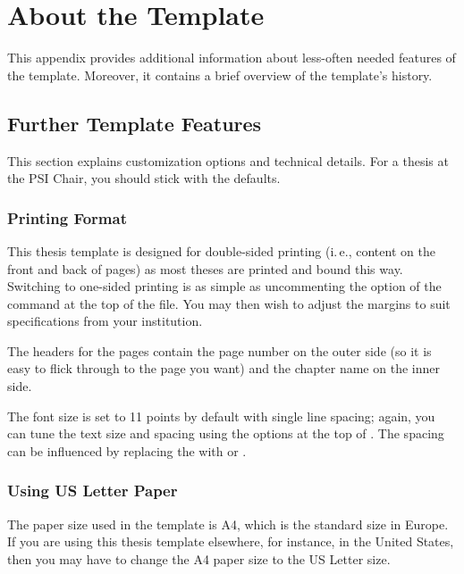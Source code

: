 
\chapter{About the Template}
\label{appendixc}
\label{appendix-more-details-on-template}

This appendix provides additional information about less-often needed features of the template. Moreover, it contains a brief overview of the template's history. 

\section{Further Template Features}\label{ThesisFeatures}

This section explains customization options and technical details. For a thesis at the PSI Chair, you should stick with the defaults.

\subsection{Printing Format}

This thesis template is designed for double-sided printing (i.\,e., content on the front and back of pages) as most theses are printed and bound this way.
Switching to one-sided printing is as simple as uncommenting the  option of the  command at the top of the  file. You may then wish to adjust the margins to suit specifications from your institution.

The headers for the pages contain the page number on the outer side (so it is easy to flick through to the page you want) and the chapter name on the inner side.

The font size is set to 11 points by default with single line spacing; again, you can tune the text size and spacing using the options at the top of . The spacing can be influenced by replacing the  with  or .

\subsection{Using US Letter Paper}

The paper size used in the template is A4, which is the standard size in Europe. If you are using this thesis template elsewhere, for instance, in the United States, then you may have to change the A4 paper size to the US Letter size.

